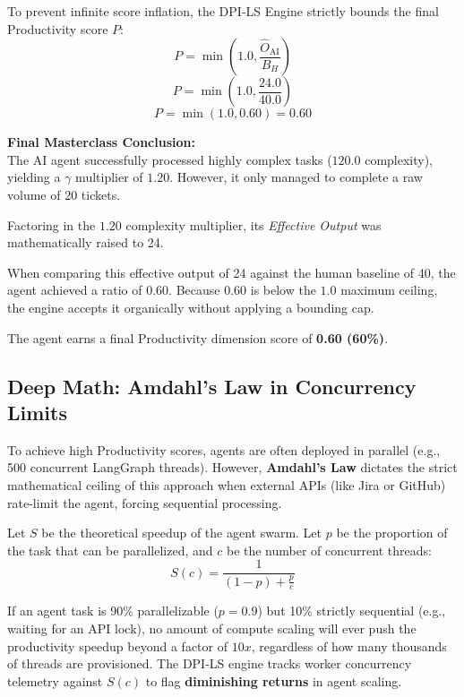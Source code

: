 \documentclass[11pt,a4paper]{article}
\begin{document}
\begin{tcolorbox}[enhanced, colback=dpigreen!5!white, colframe=dpigreen, title={\textbf{Phase 6: The Bounding Cap}}, fonttitle=\bfseries]
To prevent infinite score inflation, the DPI-LS Engine strictly bounds the final Productivity score $P$:
\[
P = \min\left(1.0, \frac{\hat{O}_{\text{AI}}}{B_H}\right)
\]
\[
P = \min\left(1.0, \frac{24.0}{40.0}\right)
\]
\[
P = \min(1.0, 0.60) = \mathbf{0.60}
\]

\vspace{0.2cm}
\textbf{Final Masterclass Conclusion:} \\
The AI agent successfully processed highly complex tasks ($120.0$ complexity), yielding a $\gamma$ multiplier of $1.20$. However, it only managed to complete a raw volume of 20 tickets. 

Factoring in the $1.20$ complexity multiplier, its \textit{Effective Output} was mathematically raised to 24. 

When comparing this effective output of 24 against the human baseline of 40, the agent achieved a ratio of $0.60$. Because $0.60$ is below the $1.0$ maximum ceiling, the engine accepts it organically without applying a bounding cap. 

The agent earns a final Productivity dimension score of \textbf{0.60 (60\%)}.
\end{tcolorbox}

\vspace{0.5cm}

\subsection{Deep Math: Amdahl's Law in Concurrency Limits}

To achieve high Productivity scores, agents are often deployed in parallel (e.g., 500 concurrent LangGraph threads). However, \textbf{Amdahl's Law} dictates the strict mathematical ceiling of this approach when external APIs (like Jira or GitHub) rate-limit the agent, forcing sequential processing.

Let $S$ be the theoretical speedup of the agent swarm. Let $p$ be the proportion of the task that can be parallelized, and $c$ be the number of concurrent threads:
\[
S(c) = \frac{1}{(1-p) + \frac{p}{c}}
\]

If an agent task is 90\% parallelizable ($p=0.9$) but 10\% strictly sequential (e.g., waiting for an API lock), no amount of compute scaling will ever push the productivity speedup beyond a factor of $10x$, regardless of how many thousands of threads are provisioned. The DPI-LS engine tracks worker concurrency telemetry against $S(c)$ to flag \textbf{diminishing returns} in agent scaling.
\end{document}
